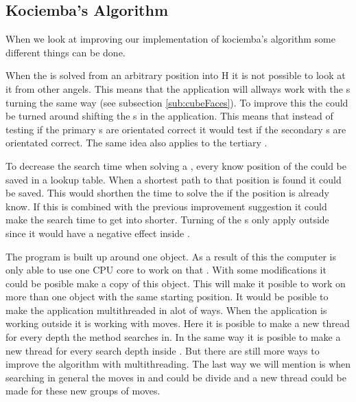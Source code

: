 \subsection{Kociemba's Algorithm}
When we look at improving our implementation of kociemba's algorithm some different things can be done.
	
When the \rubik{} is solved from an arbitrary position into H it is not possible to look at it from other angels. 
This means that the application will allways work with the \face{}s turning the same way (see subsection \ref{sub:cubeFaces}).
To improve this the \rubik{} could be turned around shifting the \face{}s in the application.
This means that instead of testing if the primary \face{} \cubie{}s are orientated correct it would test if the secondary \face{} \cubie{}s are orientated correct. 
The same idea also applies to the tertiary \face{}.
	
To decrease the search time when solving a \rubik{}, every know position of the \rubik{} could be saved in a lookup table.
When a shortest path to that position is found it could be saved.
This would shorthen the time to solve the \rubik{} if the position is already know.
If this is combined with the previous improvement suggestion it could make the search time to get into  shorter.
Turning of the \face{}s only apply outside  since it would have a negative effect inside . 
	 
The program is built up around one \cube{} object.
As a result of this the computer is only able to use one CPU core to work on that \cube{}.
With some modifications it could be posible make a copy of this \cube{} object.
This will make it posible to work on more than one \cube{} object with the same starting position.
It would be posible to make the application multithreaded in alot of ways.
When the application is working outside  it is working with  moves.
Here it is posible to make a new thread for every depth the method searches in.
In the same way it is posible to make a new thread for every search depth inside .
But there are still more ways to improve the algorithm with multithreading.
The last way we will mention is when searching in general the moves in  and  could be divide and a new thread could be made for these new groups of moves.